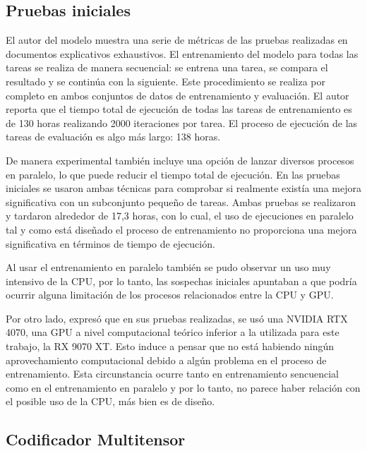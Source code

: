 \documentclass[11pt,a4paper,spanish]{book}
\numberwithin{equation}{chapter}
\numberwithin{figure}{chapter}
\begin{document}
\subsection{Pruebas iniciales}

El autor del modelo \citeauthor{liao2025arcagiwithoutpretraining} \citeyear{liao2025arcagiwithoutpretraining} muestra una serie de métricas de las pruebas realizadas en 
documentos explicativos exhaustivos. El entrenamiento del modelo para todas las tareas se realiza de manera secuencial: se entrena
una tarea, se compara el resultado y se continúa con la siguiente. Este procedimiento se realiza por completo en ambos 
conjuntos de datos de entrenamiento y evaluación. El autor reporta que el tiempo total de ejecución de todas las tareas de entrenamiento es 
de 130 horas realizando 2000 iteraciones por tarea. El proceso de ejecución de las tareas de evaluación es algo más largo: 138 horas.

De manera experimental también incluye una opción de lanzar diversos procesos en paralelo, lo que puede reducir 
el tiempo total de ejecución. En las pruebas iniciales se usaron ambas técnicas para comprobar si realmente existía una mejora
significativa con un subconjunto pequeño de tareas. Ambas pruebas se realizaron y tardaron alrededor de 17,3 horas, con lo cual,
el uso de ejecuciones en paralelo tal y como está diseñado el proceso de entrenamiento no proporciona una mejora significativa en términos de tiempo de ejecución.

Al usar el entrenamiento en paralelo también se pudo observar un uso muy intensivo de la CPU, por lo tanto, las sospechas iniciales
apuntaban a que podría ocurrir alguna limitación de los procesos relacionados entre la CPU y GPU.

Por otro lado, \citeauthor{liao2025arcagiwithoutpretraining} \citeyear{liao2025arcagiwithoutpretraining} expresó que en sus pruebas realizadas, 
se usó una NVIDIA RTX 4070, una GPU
a nivel computacional teórico inferior a la utilizada para este trabajo, la RX 9070 XT. Esto induce a pensar que no está habiendo ningún
aprovechamiento computacional debido a algún problema en el proceso de entrenamiento. Esta circunstancia ocurre tanto en entrenamiento
sencuencial como en el entrenamiento en paralelo y por lo tanto, no parece haber relación con el posible uso de la CPU, más bien es de 
diseño.

\subsection{Codificador Multitensor}
\end{document}
